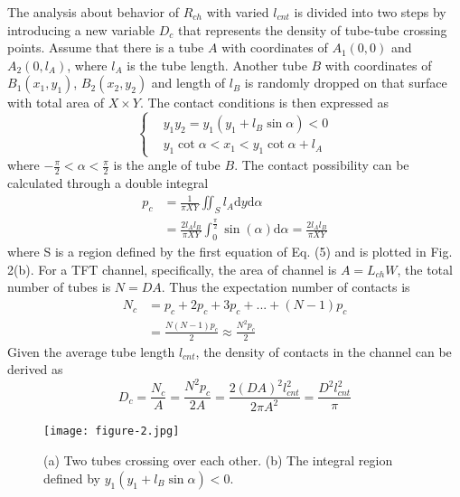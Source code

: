 \documentclass[letterpaper, 10 pt, conference]{ieeeconf}
\begin{document}
The analysis about behavior of $R_{ch}$ with varied $l_{cnt}$ is divided into two steps by introducing a new variable $D_c$ that represents the density of tube-tube crossing points. Assume that there is a tube $A$ with coordinates of $A_1(0,0)$ and $A_2(0,l_A)$, where $l_A$ is the tube length. Another tube $B$ with coordinates of $B_1(x_1,y_1)$, $B_2(x_2,y_2)$ and length of $l_B$ is randomly dropped on that surface with total area of $X\times Y$. The contact conditions is then expressed as
\begin{equation}
  \left\{
  \begin{aligned}
    &y_1y_2=y_1(y_1+l_B\sin\alpha)<0 \\
    &y_1\cot\alpha<x_1<y_1\cot\alpha+l_A
  \end{aligned}
  \right.
\end{equation}
where $-\frac{\pi}{2}<\alpha<\frac{\pi}{2}$ is the angle of tube $B$. The contact possibility can be calculated through a double integral
\begin{equation}
  \begin{aligned}
    p_c&=\frac{1}{\pi XY}\iint_Sl_A\mathrm{d}y\mathrm{d}\alpha \\
    &=\frac{2l_Al_B}{\pi XY}\int_0^{\frac{\pi}{2}}\sin(\alpha)\mathrm{d}\alpha=\frac{2l_Al_B}{\pi XY}
  \end{aligned}
\end{equation}
where S is a region defined by the first equation of Eq. (5) and is plotted in Fig. 2(b). For a TFT channel, specifically, the area of channel is $A=L_{ch}W$, the total number of tubes is $N=DA$. Thus the expectation number of contacts is
\begin{equation}
  \begin{aligned}
    N_c&=p_c+2p_c+3p_c+...+(N-1)p_c \\
    &=\frac{N(N-1)p_c}{2}\approx \frac{N^2p_c}{2}
  \end{aligned}
\end{equation}
Given the average tube length $l_{cnt}$, the density of contacts in the channel can be derived as
\begin{equation}
  D_c=\frac{N_c}{A}=\frac{N^2p_c}{2A}=\frac{2(DA)^2l_{cnt}^2}{2\pi A^2}=\frac{D^2l_{cnt}^2}{\pi}
\end{equation}

\begin{figure}[!h]
  \centering
  \texttt{[image: figure-2.jpg]}
  \caption{
    (a) Two tubes crossing over each other. (b) The integral region defined by $y_1(y_1+l_B\sin\alpha)<0$.
  }
\end{figure}
\end{document}
